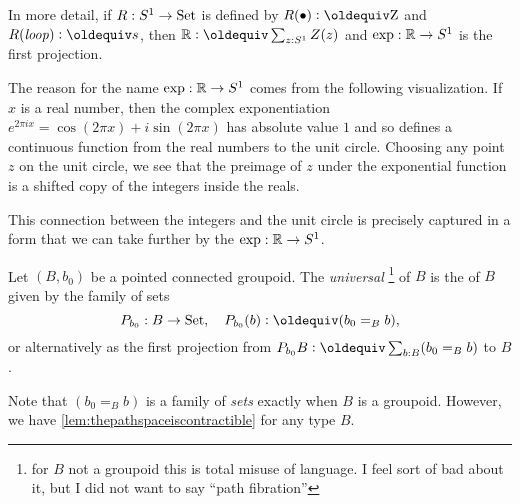In more detail, if $R:S^1\to\mathord{\mathrm{Set}}$ is defined by $R(\base)\defequi\zet$ and $R(\Sloop)\defequi s$, then $\mathbb R\defequi\sum_{z:\Sc}Z(z)$ and $\exp:\mathbb R\to S^1$ is the first projection.

\begin{remark}
  \label{rem:expforreal}
  The reason for the name $\exp:\mathbb R\to S^1$ comes from the following visualization.  
If $x$ is a real number, then the complex exponentiation $e^{2\pi i x}=\cos(2\pi x)+i\sin(2\pi x)$ has absolute value $1$ and so defines a continuous function from the real numbers to the unit circle.  
Choosing any point $z$ on the unit circle, we see that the preimage of $z$ under the exponential function is a shifted copy of the integers inside the reals. 
 
This connection between the integers and the unit circle is precisely captured in a form that we can take further by the \covering $\exp:\mathbb R\to S^1$.
\end{remark}

\begin{definition}
  \label{def:universalcover}
  Let $(B,b_0)$ be a pointed connected groupoid.  
The \emph{universal \covering}\footnote{for $B$ not a groupoid this is total misuse of language.  I feel sort of bad about it, but I did not want to say ``path fibration''} of $B$ is the \covering of $B$ given by the family of sets 
  $$P_{b_0}:B\to\Set,\quad P_{b_0}(b)\defequi (b_0=_Bb),$$
or alternatively as the first projection from $P_{b_0}B\defequi\sum_{b:B}(b_0=_Bb)$ to $B$. 
\end{definition}
Note that $(b_0=_B b)$ is a family of \emph{sets} exactly when $B$ is a groupoid. 
However, we have \cref{lem:thepathspaceiscontractible} for any type $B$.

